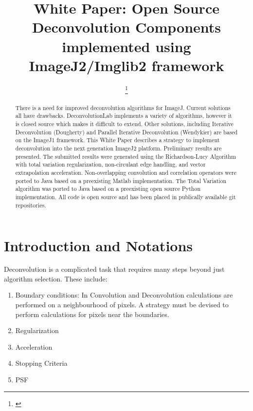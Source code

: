 \documentclass[conference,a4paper]{IEEEtran}
\title{White Paper: Open Source Deconvolution Components implemented
using ImageJ2/Imglib2 framework}
\author{
	\IEEEauthorblockN{
		Brian Northan\IEEEauthorrefmark{1},
	}

	\IEEEauthorblockA{\IEEEauthorrefmark{1} True North Intelligent Algorithms, Guilderland, New York}

	\thanks{\textit{}}
}
\begin{document}
\maketitle

\begin{abstract}
There is a need for improved deconvolution algorithms for ImageJ.
Current solutions all have drawbacks.  DeconvolutionLab implements a
variety of algorithms, however it is closed source which makes it
difficult to extend.  Other solutions, including Iterative Deconvolution
(Dougherty) and Parallel Iterative Deconvolution (Wendykier) are based
on the ImageJ1 framework.  This White Paper describes a strategy to
implement deconvolution into the next generation ImageJ2 platform.
Preliminary results are presented.  The submitted results were generated
using the Richardson-Lucy Algorithm with total variation regularization, non-circulant
edge handling, and vector extrapolation acceleration.  Non-overlapping
convolution and correlation operators were ported to Java based on a
preexisting Matlab implementation.  The Total Variation algorithm was
ported to Java based on a preexisting open source Python implementation.
All code is open source and has been placed in publically available git
repositories.  
\end{abstract}


\section{Introduction and Notations}

Deconvolution is a complicated task that requires many steps beyond just algorithm selection.  These include:   

\begin{enumerate} 

\item Boundary conditions: In Convolution and Deconvolution calculations are performed on a neighbourhood of pixels.  A strategy must be devised to perform calculations for pixels near the boundaries.  
\item Regularization
\item Acceleration
\item Stopping Criteria
\item PSF
\end{enumerate}
\end{document}
